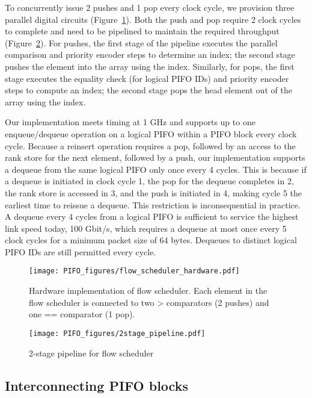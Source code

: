 To concurrently issue 2 pushes and 1 pop every clock cycle, we provision three
parallel digital circuits (Figure~\ref{fig:flow_scheduler}). Both the
push and pop require 2 clock cycles to complete and need to be pipelined
 to maintain the required throughput (Figure~\ref{fig:2stage}). For pushes, the first stage of the pipeline executes
the parallel comparison and priority encoder steps to determine an index; the
second stage pushes the element into the array using the index.  Similarly, for
pops, the first stage executes the equality check (for logical PIFO IDs) and
priority encoder steps to compute an index; the second stage pops the head
element out of the array using the index.

Our implementation meets timing at 1 GHz and supports up to one enqueue/dequeue
operation on a logical PIFO within a PIFO block every clock cycle. Because a
reinsert operation requires a pop, followed by an access to the rank store for
the next element, followed by a push, our implementation supports a dequeue
from the same logical PIFO only once every 4 cycles. This is because if a dequeue is initiated
in clock cycle 1, the pop for the dequeue completes in 2, the rank store is accessed in 3, and
the push is initiated in 4, making cycle 5 the earliest time to reissue a dequeue.
This restriction is inconsequential in practice.  A dequeue every 4 cycles from
a logical PIFO is sufficient to service the highest link speed today, 100
Gbit/s, which requires a dequeue at most once every 5 clock cycles for a
minimum packet size of 64 bytes. Dequeues to distinct logical PIFO IDs are
still permitted every cycle.

\begin{figure}[!t]
  \centering
  \texttt{[image: PIFO\_figures/flow\_scheduler\_hardware.pdf]}
  \caption{Hardware implementation of flow scheduler. Each element in the flow
  scheduler is connected to two > comparators (2 pushes) and one == comparator (1
  pop).}
  \label{fig:flow_scheduler}
\end{figure}

\begin{figure}[!t]
  \centering
  \texttt{[image: PIFO\_figures/2stage\_pipeline.pdf]}
  \caption{2-stage pipeline for flow scheduler}
  \label{fig:2stage}
\end{figure}

\subsection{Interconnecting PIFO blocks}
\label{ss:interconnect}

